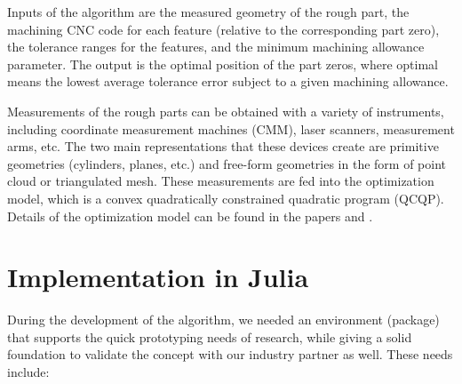 \documentclass{juliacon}
\begin{document}
Inputs of the algorithm are the measured geometry of the rough part, the machining CNC code for each feature (relative to the corresponding part zero), the tolerance ranges for the features, and the minimum machining allowance parameter.
The output is the optimal position of the part zeros, where optimal means the lowest average tolerance error subject to a given machining allowance.

Measurements of the rough parts can be obtained with a variety of instruments, including coordinate measurement machines (CMM), laser scanners, measurement arms, etc.
The two main representations that these devices create are primitive geometries (cylinders, planes, etc.) and free-form geometries in the form of point cloud or triangulated mesh.
These measurements are fed into the optimization model, which is a convex quadratically constrained quadratic program (QCQP).
Details of the optimization model can be found in the papers \cite{cserteg:2023_Annals} and \cite{cserteg:2023_CMS}.

\section{Implementation in Julia}
\label{sec:approach}

During the development of the algorithm, we needed an environment (package) that supports the quick prototyping needs of research, while giving a solid foundation to validate the concept with our industry partner as well.
These needs include:
\end{document}
